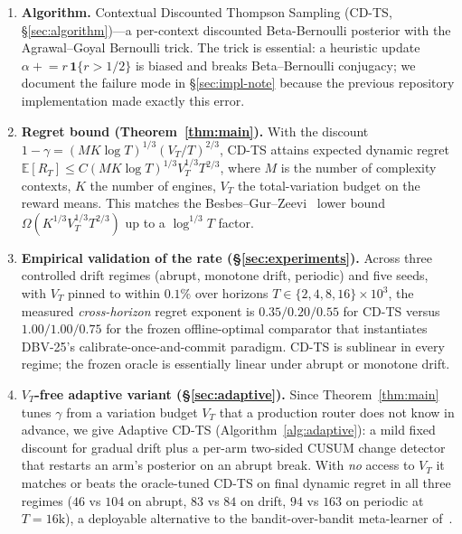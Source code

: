 \documentclass[11pt]{article}
\theoremstyle{definition}
\newcommand{\E}{\mathbb{E}}
\newcommand{\one}[1]{\mathbf{1}\{#1\}}
\begin{document}
\begin{enumerate}[leftmargin=*, itemsep=2pt, topsep=2pt]
\item \textbf{Algorithm.} Contextual Discounted Thompson Sampling
(\textsc{CD-TS}, \S\ref{sec:algorithm})---a per-context discounted
Beta-Bernoulli posterior with the Agrawal--Goyal Bernoulli trick. The
trick is essential: a heuristic update $\alpha \mathrel{+}= r\, \one{r>1/2}$
is biased and breaks Beta--Bernoulli conjugacy; we document the failure
mode in \S\ref{sec:impl-note} because the previous repository
implementation made exactly this error.

\item \textbf{Regret bound (Theorem~\ref{thm:main}).} With the discount
$1-\gamma = (MK\log T)^{1/3}(V_T/T)^{2/3}$, CD-TS attains expected dynamic
regret
$\E[R_T] \leq C(MK\log T)^{1/3} V_T^{1/3} T^{2/3}$, where $M$ is the
number of complexity contexts, $K$ the number of engines, $V_T$ the
total-variation budget on the reward means. This matches the
Besbes--Gur--Zeevi~\cite{besbes2014stochastic} lower bound
$\Omega(K^{1/3}V_T^{1/3}T^{2/3})$ up to a $\log^{1/3} T$ factor.

\item \textbf{Empirical validation of the rate
(\S\ref{sec:experiments}).} Across three controlled drift regimes
(abrupt, monotone drift, periodic) and five seeds, with $V_T$ pinned to
within $0.1\%$ over horizons $T \in \{2,4,8,16\}\!\times\!10^3$, the
measured \emph{cross-horizon} regret exponent is $0.35/0.20/0.55$ for
CD-TS versus $1.00/1.00/0.75$ for the frozen offline-optimal comparator
that instantiates DBV-25's calibrate-once-and-commit paradigm. CD-TS is
sublinear in every regime; the frozen oracle is essentially linear under
abrupt or monotone drift.

\item \textbf{$V_T$-free adaptive variant (\S\ref{sec:adaptive}).} Since
Theorem~\ref{thm:main} tunes $\gamma$ from a variation budget $V_T$ that a
production router does not know in advance, we give Adaptive CD-TS
(Algorithm~\ref{alg:adaptive}): a mild fixed discount for gradual drift plus a
per-arm two-sided CUSUM change detector~\cite{liu2018change,cao2019nearly}
that restarts an arm's posterior on an abrupt break. With \emph{no} access to
$V_T$ it matches or beats the oracle-tuned CD-TS on final dynamic regret in all
three regimes ($46$ vs $104$ on abrupt, $83$ vs $84$ on drift, $94$ vs $163$
on periodic at $T{=}16\mathrm{k}$), a deployable alternative to the
bandit-over-bandit meta-learner of~\cite{cheung2019learning}.


\end{enumerate}
\end{document}
